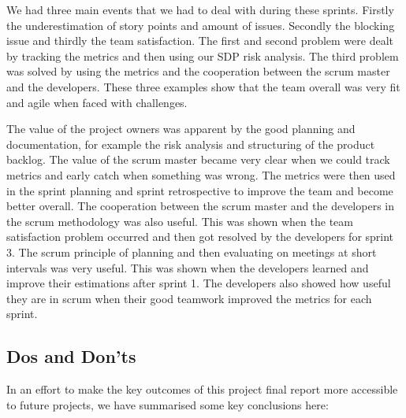 \documentclass{article}
\begin{document}
We had three main events that we had to deal with during these sprints. Firstly the underestimation of story points and amount of issues. Secondly the blocking issue and thirdly the team satisfaction. The first and second problem were dealt by tracking the metrics and then using our SDP risk analysis. The third problem was solved by using the metrics and the cooperation between the scrum master and the developers. These three examples show that the team overall was very fit and agile when faced with challenges. %

The value of the project owners was apparent by the good planning and documentation, for example the risk analysis and structuring of the product backlog. The value of the scrum master became very clear when we could track metrics and early catch when something was wrong. The metrics were then used in the sprint planning and sprint retrospective to improve the team and become better overall. The cooperation between the scrum master and the developers in the scrum methodology was also useful. This was shown when the team satisfaction problem occurred and then got resolved by the developers for sprint 3. The scrum principle of planning and then evaluating on meetings at short intervals was very useful. This was shown when the developers learned and improve their estimations after sprint 1. The developers also showed how useful they are in scrum when their good teamwork improved the metrics for each sprint.

\subsection{Dos and Don'ts}
In an effort to make the key outcomes of this project final report more accessible to future projects, we have summarised some key conclusions here:
\end{document}
